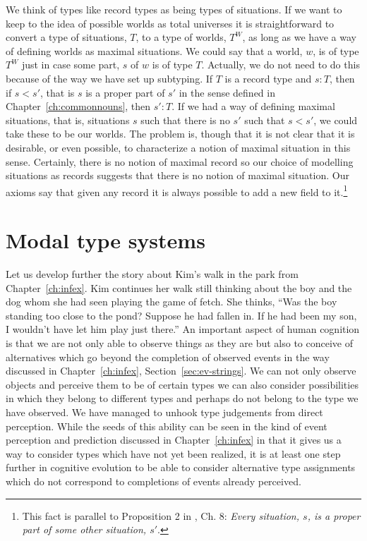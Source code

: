 We think of types like record types as being types of
situations.  If we want to keep to the idea of possible worlds as
total universes it is straightforward to convert a type of situations, $T$,
to a type of worlds, $T^W$, as long as we have a way of defining
worlds as maximal situations.  We could say that a world, $w$, is of
type $T^W$ just in case some part, $s$ of $w$ is of type $T$.
Actually, we do not need to do this because of the way we have set up
subtyping.  If $T$ is a record type and $s:T$, then if $s<s'$, that is
$s$ is a proper part of $s'$ in the sense defined in
Chapter~\ref{ch:commonnouns}, then $s':T$.  If we had a way of
defining maximal situations, that is, situations $s$ such that there
is no $s'$ such that $s<s'$, we could take these to be our worlds.
The problem is, though that it
is not clear that it is desirable, or even possible, to characterize a
notion of maximal situation in this sense.  Certainly, there is no
notion of maximal record so our choice of modelling situations as
records suggests that there is no notion of maximal situation.  Our axioms say that given any record it is
always possible to add a new field to it.\footnote{This fact is
  parallel to Proposition 2 in \cite{Barwise1989}, Ch. 8:
  \textit{Every situation, $s$, is a proper part of some other
    situation, $s'$}.}  



\section{Modal type systems}%
\label{sec:percint-modal}

Let us develop further the story about Kim's walk in the park from
Chapter~\ref{ch:infex}.  Kim continues her walk still thinking about
the boy and the dog  whom she had seen playing the game of fetch.  She
thinks,  ``Was
the boy standing too close to the pond?  Suppose he had fallen in.  If
he had been my son, I wouldn't have let him play just there.'' An
important aspect of human cognition is that we are not only able to
observe things as they are but also to conceive of alternatives which
go beyond the completion of observed events in the way discussed in
Chapter~\ref{ch:infex}, 
Section~\ref{sec:ev-strings}. We can not only observe objects and
perceive them to be of certain types we can also consider
possibilities in which they belong to different types and perhaps do
not belong to the type we have observed.  We have managed to unhook
type judgements from direct perception.  While the seeds of this
ability can be seen in the kind of event perception and prediction
discussed in Chapter~\ref{ch:infex} in that it gives us a way to consider types which have
not yet been realized, it is at least one step further in cognitive
evolution to be able to consider alternative type assignments which do
not correspond to completions of events already perceived.

